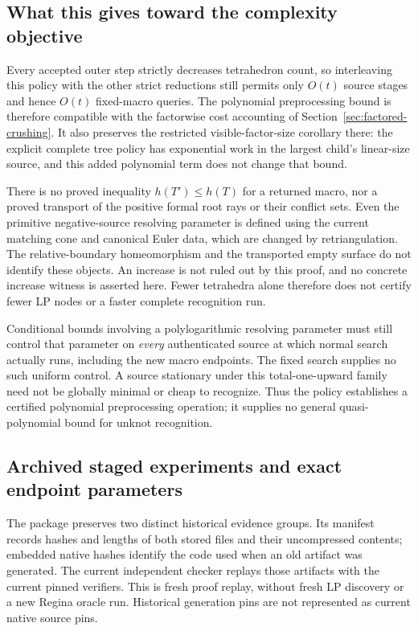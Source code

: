 \subsection{What this gives toward the complexity objective}

Every accepted outer step strictly decreases tetrahedron count, so
interleaving this policy with the other strict reductions still permits
only $O(t)$ source stages and hence $O(t)$ fixed-macro queries.  The
polynomial preprocessing bound is therefore compatible with the
factorwise cost accounting of Section~\ref{sec:factored-crushing}.
It also preserves the restricted visible-factor-size corollary there:
the explicit complete tree policy has exponential work in the largest
child's linear-size source, and this added polynomial term does not
change that bound.

There is no proved inequality $h(T')\le h(T)$ for a returned macro,
nor a proved transport of the positive formal root rays or their
conflict sets.  Even the primitive negative-source resolving parameter
is defined using the current matching cone and canonical Euler data,
which are changed by retriangulation.  The relative-boundary
homeomorphism and the transported empty surface do not identify these
objects.  An increase is not ruled out by this proof, and no concrete
increase witness is asserted here.  Fewer tetrahedra alone therefore
does not certify fewer LP nodes or a faster complete recognition run.

Conditional bounds involving a polylogarithmic resolving parameter
must still control that parameter on \emph{every} authenticated source
at which normal search actually runs, including the new macro endpoints.
The fixed search supplies no such uniform control.  A source stationary
under this total-one-upward family need not be globally minimal or
cheap to recognize.  Thus the policy establishes a certified polynomial
preprocessing operation; it supplies no general quasi-polynomial bound
for unknot recognition.

\subsection{Archived staged experiments and exact endpoint parameters}
\label{sec:pachner-descent-crushing-staged}

The package  preserves two distinct
historical evidence groups.  Its manifest records hashes and lengths of
both stored files and their uncompressed contents; embedded native hashes
identify the code used when an old artifact was generated.  The current
independent checker replays those artifacts with the current pinned
verifiers.  This is fresh proof replay, without fresh LP discovery or a
new Regina oracle run.  Historical generation pins are not represented
as current native source pins.

